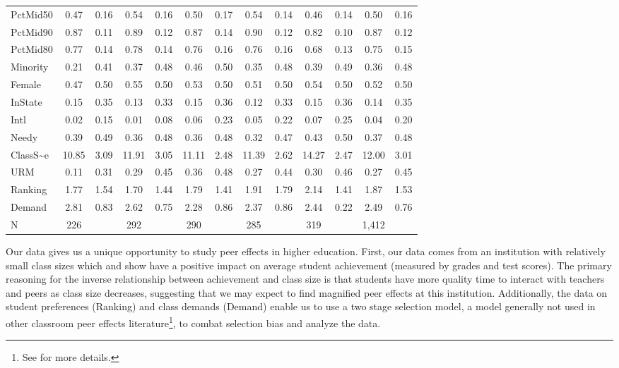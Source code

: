 \begin{sidewaystable}
\begin{tabular}{l|c|c|c|c|c|c|c|c|c|c|c|c}
            PctMid50                 & 0.47  & 0.16 & 0.54  & 0.16 & 0.50  & 0.17 & 0.54  & 0.14 & 0.46  & 0.14 & 0.50  & 0.16 \\
            PctMid90                 & 0.87  & 0.11 & 0.89  & 0.12 & 0.87  & 0.14 & 0.90  & 0.12 & 0.82  & 0.10 & 0.87  & 0.12 \\
            PctMid80                 & 0.77  & 0.14 & 0.78  & 0.14 & 0.76  & 0.16 & 0.76  & 0.16 & 0.68  & 0.13 & 0.75  & 0.15 \\
            Minority                 & 0.21  & 0.41 & 0.37  & 0.48 & 0.46  & 0.50 & 0.35  & 0.48 & 0.39  & 0.49 & 0.36  & 0.48 \\
            Female                   & 0.47  & 0.50 & 0.55  & 0.50 & 0.53  & 0.50 & 0.51  & 0.50 & 0.54  & 0.50 & 0.52  & 0.50 \\
            InState                  & 0.15  & 0.35 & 0.13  & 0.33 & 0.15  & 0.36 & 0.12  & 0.33 & 0.15  & 0.36 & 0.14  & 0.35 \\
            Intl                     & 0.02  & 0.15 & 0.01  & 0.08 & 0.06  & 0.23 & 0.05  & 0.22 & 0.07  & 0.25 & 0.04  & 0.20 \\
            Needy                    & 0.39  & 0.49 & 0.36  & 0.48 & 0.36  & 0.48 & 0.32  & 0.47 & 0.43  & 0.50 & 0.37  & 0.48 \\
            ClassS{\textasciitilde}e & 10.85 & 3.09 & 11.91 & 3.05 & 11.11 & 2.48 & 11.39 & 2.62 & 14.27 & 2.47 & 12.00 & 3.01 \\
            URM                      & 0.11  & 0.31 & 0.29  & 0.45 & 0.36  & 0.48 & 0.27  & 0.44 & 0.30  & 0.46 & 0.27  & 0.45 \\
            Ranking                  & 1.77  & 1.54 & 1.70  & 1.44 & 1.79  & 1.41 & 1.91  & 1.79 & 2.14  & 1.41 & 1.87  & 1.53 \\
            Demand                   & 2.81  & 0.83 & 2.62  & 0.75 & 2.28  & 0.86 & 2.37  & 0.86 & 2.44  & 0.22 & 2.49  & 0.76 \\
\hline
            N                        & 226   &      & 292   &      & 290   &      & 285   &      & 319   &      & 1,412        \\
\hline
\hline
\end{tabular}
\end{sidewaystable}

\newpage{}

Our data gives us a unique opportunity to study peer effects in higher education.
First, our data comes from an institution with relatively small class sizes which \citet{diette2015class} and \citet{kokkelenberg2008effects} show have a positive impact on average student achievement (measured by grades and test scores).
The primary reasoning for the inverse relationship between achievement and class size is that students have more quality time to interact with teachers and peers as class size decreases, suggesting that we may expect to find magnified peer effects at this institution. 
Additionally, the data on student preferences (Ranking) and class demands (Demand) enable us to use a two stage selection model, a model generally not used in other classroom peer effects literature\footnote{See  for more details.}, to combat selection bias and analyze the data. 